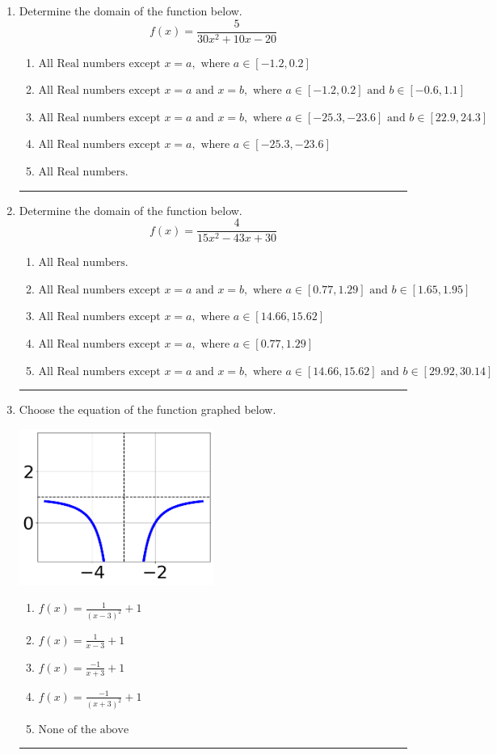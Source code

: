 \documentclass[14pt]{extbook}
\newcommand{\litem}[1]{\item#1\hspace*{-1cm}\rule{\textwidth}{0.4pt}}
\begin{document}
\begin{enumerate}
\litem{
Determine the domain of the function below.\[ f(x) = \frac{5}{30x^{2} +10 x -20} \]\begin{enumerate}[label=\Alph*.]
\item \( \text{All Real numbers except } x = a, \text{ where } a \in [-1.2, 0.2] \)
\item \( \text{All Real numbers except } x = a \text{ and } x = b, \text{ where } a \in [-1.2, 0.2] \text{ and } b \in [-0.6, 1.1] \)
\item \( \text{All Real numbers except } x = a \text{ and } x = b, \text{ where } a \in [-25.3, -23.6] \text{ and } b \in [22.9, 24.3] \)
\item \( \text{All Real numbers except } x = a, \text{ where } a \in [-25.3, -23.6] \)
\item \( \text{All Real numbers.} \)

\end{enumerate} }
\litem{
Determine the domain of the function below.\[ f(x) = \frac{4}{15x^{2} -43 x + 30} \]\begin{enumerate}[label=\Alph*.]
\item \( \text{All Real numbers.} \)
\item \( \text{All Real numbers except } x = a \text{ and } x = b, \text{ where } a \in [0.77, 1.29] \text{ and } b \in [1.65, 1.95] \)
\item \( \text{All Real numbers except } x = a, \text{ where } a \in [14.66, 15.62] \)
\item \( \text{All Real numbers except } x = a, \text{ where } a \in [0.77, 1.29] \)
\item \( \text{All Real numbers except } x = a \text{ and } x = b, \text{ where } a \in [14.66, 15.62] \text{ and } b \in [29.92, 30.14] \)

\end{enumerate} }
\litem{
Choose the equation of the function graphed below.
\begin{center}
    \includegraphics[width=0.5\textwidth]{../Figures/rationalGraphToEquationCopyB.png}
\end{center}
\begin{enumerate}[label=\Alph*.]
\item \( f(x) = \frac{1}{(x - 3)^2} + 1 \)
\item \( f(x) = \frac{1}{x - 3} + 1 \)
\item \( f(x) = \frac{-1}{x + 3} + 1 \)
\item \( f(x) = \frac{-1}{(x + 3)^2} + 1 \)
\item \( \text{None of the above} \)


\end{enumerate}}
\end{enumerate}
\end{document}
